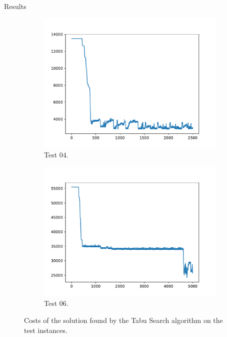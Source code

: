 \begin{section}{Results}
\begin{figure}
\begin{subfigure}{0.45\textwidth}
         \includegraphics[width=\textwidth]{../logs/test04.pdf}
         \caption{Test $04$.}
     \end{subfigure}
     \begin{subfigure}{0.45\textwidth}
         \includegraphics[width=\textwidth]{../logs/test06.pdf}
         \caption{Test $06$.}
     \end{subfigure}
     \caption{Costs of the solution found by the Tabu Search algorithm on the test instances.}
     \label{fig:plot}
 \end{figure}

\end{section}